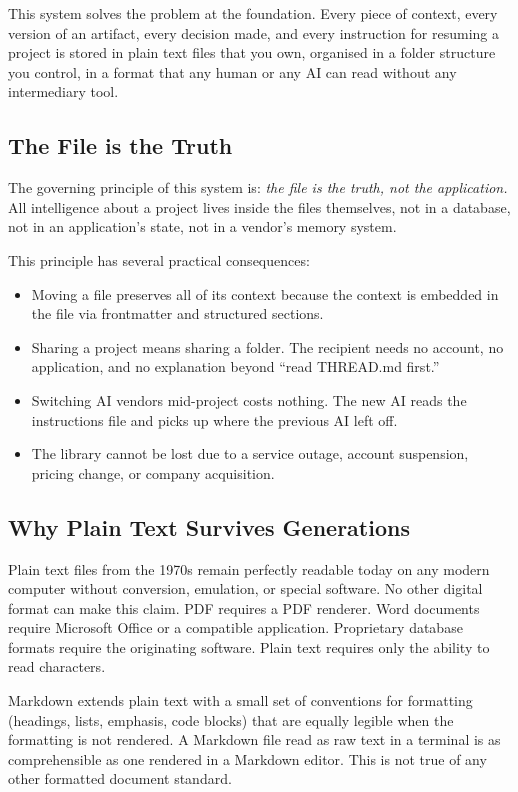 \documentclass[12pt,letterpaper]{article}
\begin{document}
This system solves the problem at the foundation. Every piece of context,
every version of an artifact, every decision made, and every instruction for
resuming a project is stored in plain text files that you own, organised in a
folder structure you control, in a format that any human or any AI can read
without any intermediary tool.

\subsection{The File is the Truth}

The governing principle of this system is: \textit{the file is the truth, not the
application.} All intelligence about a project lives inside the files themselves,
not in a database, not in an application's state, not in a vendor's memory system.

This principle has several practical consequences:

\begin{itemize}
  \item Moving a file preserves all of its context because the context is embedded
        in the file via frontmatter and structured sections.
  \item Sharing a project means sharing a folder. The recipient needs no account,
        no application, and no explanation beyond ``read THREAD.md first.''
  \item Switching AI vendors mid-project costs nothing. The new AI reads the
        instructions file and picks up where the previous AI left off.
  \item The library cannot be lost due to a service outage, account suspension,
        pricing change, or company acquisition.
\end{itemize}

\subsection{Why Plain Text Survives Generations}

Plain text files from the 1970s remain perfectly readable today on any modern
computer without conversion, emulation, or special software. No other digital
format can make this claim. PDF requires a PDF renderer. Word documents require
Microsoft Office or a compatible application. Proprietary database formats require
the originating software. Plain text requires only the ability to read characters.

Markdown extends plain text with a small set of conventions for formatting
(headings, lists, emphasis, code blocks) that are equally legible when the
formatting is not rendered. A Markdown file read as raw text in a terminal
is as comprehensible as one rendered in a Markdown editor. This is not true
of any other formatted document standard.
\end{document}
